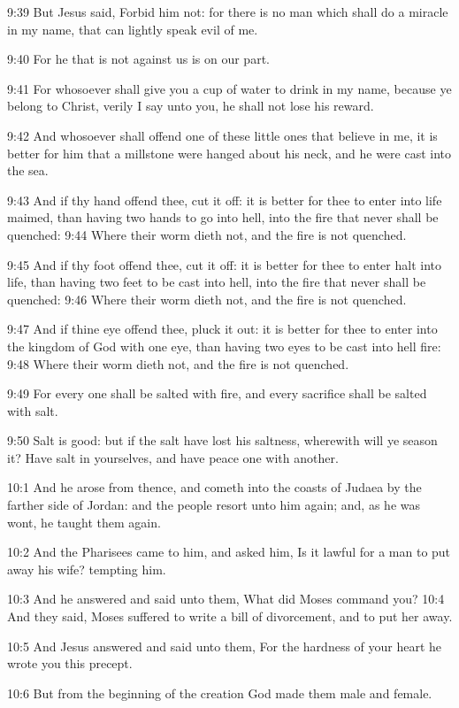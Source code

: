 9:39 But Jesus said, Forbid him not: for there is no man which shall
do a miracle in my name, that can lightly speak evil of me.

9:40 For he that is not against us is on our part.

9:41 For whosoever shall give you a cup of water to drink in my name,
because ye belong to Christ, verily I say unto you, he shall not lose
his reward.

9:42 And whosoever shall offend one of these little ones that believe
in me, it is better for him that a millstone were hanged about his
neck, and he were cast into the sea.

9:43 And if thy hand offend thee, cut it off: it is better for thee to
enter into life maimed, than having two hands to go into hell, into
the fire that never shall be quenched: 9:44 Where their worm dieth
not, and the fire is not quenched.

9:45 And if thy foot offend thee, cut it off: it is better for thee to
enter halt into life, than having two feet to be cast into hell, into
the fire that never shall be quenched: 9:46 Where their worm dieth
not, and the fire is not quenched.

9:47 And if thine eye offend thee, pluck it out: it is better for thee
to enter into the kingdom of God with one eye, than having two eyes to
be cast into hell fire: 9:48 Where their worm dieth not, and the fire
is not quenched.

9:49 For every one shall be salted with fire, and every sacrifice
shall be salted with salt.

9:50 Salt is good: but if the salt have lost his saltness, wherewith
will ye season it? Have salt in yourselves, and have peace one with
another.

10:1 And he arose from thence, and cometh into the coasts of Judaea by
the farther side of Jordan: and the people resort unto him again; and,
as he was wont, he taught them again.

10:2 And the Pharisees came to him, and asked him, Is it lawful for a
man to put away his wife? tempting him.

10:3 And he answered and said unto them, What did Moses command you?
10:4 And they said, Moses suffered to write a bill of divorcement, and
to put her away.

10:5 And Jesus answered and said unto them, For the hardness of your
heart he wrote you this precept.

10:6 But from the beginning of the creation God made them male and
female.

